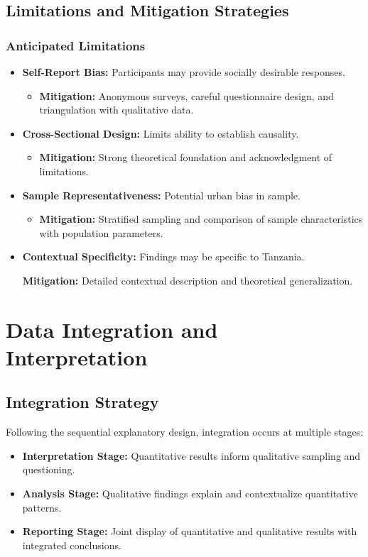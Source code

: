 \begin{enumerate}
\subsection{Limitations and Mitigation Strategies}

\subsubsection{Anticipated Limitations}
\begin{itemize}
    \item \textbf{Self-Report Bias:} Participants may provide socially desirable responses.
        \begin{itemize}
            \item \textbf{Mitigation:} Anonymous surveys, careful questionnaire design, and triangulation with qualitative data.
        \end{itemize}
    \item \textbf{Cross-Sectional Design:} Limits ability to establish causality.
        \begin{itemize}
            \item \textbf{Mitigation:} Strong theoretical foundation and acknowledgment of limitations.
        \end{itemize}
    \item \textbf{Sample Representativeness:} Potential urban bias in sample.
        \begin{itemize}
            \item \textbf{Mitigation:} Stratified sampling and comparison of sample characteristics with population parameters.
        \end{itemize}
    \item \textbf{Contextual Specificity:} Findings may be specific to Tanzania.
        \begin{itemize}
            \textbf{Mitigation:} Detailed contextual description and theoretical generalization.
        \end{itemize}
\end{itemize}

\section{Data Integration and Interpretation}

\subsection{Integration Strategy}
Following the sequential explanatory design, integration occurs at multiple stages:
\begin{itemize}
    \item \textbf{Interpretation Stage:} Quantitative results inform qualitative sampling and questioning.
    \item \textbf{Analysis Stage:} Qualitative findings explain and contextualize quantitative patterns.
    \item \textbf{Reporting Stage:} Joint display of quantitative and qualitative results with integrated conclusions.
\end{itemize}


\end{enumerate}
